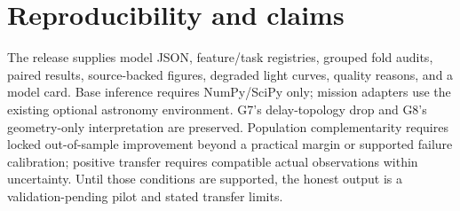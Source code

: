 \documentclass[11pt]{article}
\begin{document}
\section{Reproducibility and claims}
The release supplies model JSON, feature/task registries, grouped fold audits,
paired results, source-backed figures, degraded light curves, quality reasons,
and a model card. Base inference requires NumPy/SciPy only; mission adapters use
the existing optional astronomy environment. G7's delay-topology drop and G8's
geometry-only interpretation are preserved. Population complementarity requires
locked out-of-sample improvement beyond a practical margin or supported failure
calibration; positive transfer requires compatible actual observations within
uncertainty. Until those conditions are supported, the honest output is a
validation-pending pilot and stated transfer limits.

\end{document}
